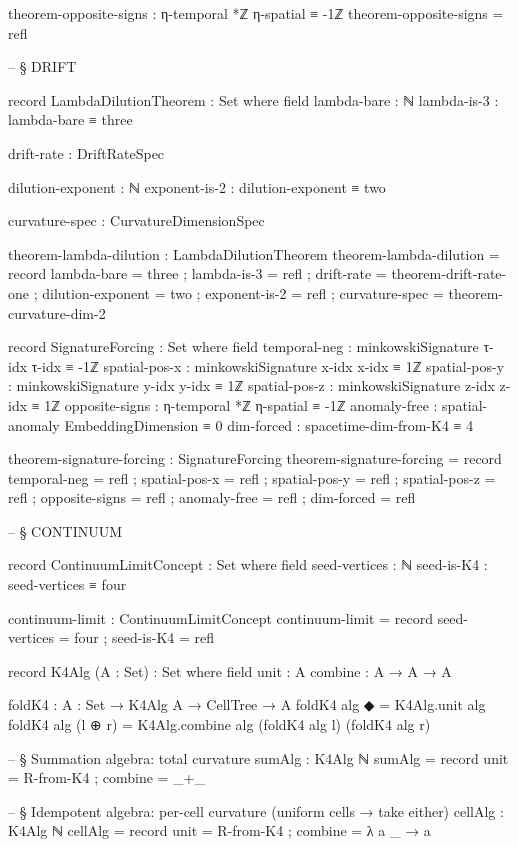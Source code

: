 \documentclass[11pt,a4paper]{book}
\begin{document}
\begin{code}
theorem-opposite-signs : η-temporal *ℤ η-spatial ≡ -1ℤ
theorem-opposite-signs = refl


-- § DRIFT

record LambdaDilutionTheorem : Set where
  field
    lambda-bare : ℕ
    lambda-is-3 : lambda-bare ≡ three
    
    drift-rate : DriftRateSpec
    
    dilution-exponent : ℕ
    exponent-is-2 : dilution-exponent ≡ two
    
    curvature-spec : CurvatureDimensionSpec
    
theorem-lambda-dilution : LambdaDilutionTheorem
theorem-lambda-dilution = record
  { lambda-bare = three
  ; lambda-is-3 = refl
  ; drift-rate = theorem-drift-rate-one
  ; dilution-exponent = two
  ; exponent-is-2 = refl
  ; curvature-spec = theorem-curvature-dim-2
  }

record SignatureForcing : Set where
  field
    temporal-neg   : minkowskiSignature τ-idx τ-idx ≡ -1ℤ
    spatial-pos-x  : minkowskiSignature x-idx x-idx ≡ 1ℤ
    spatial-pos-y  : minkowskiSignature y-idx y-idx ≡ 1ℤ
    spatial-pos-z  : minkowskiSignature z-idx z-idx ≡ 1ℤ
    opposite-signs : η-temporal *ℤ η-spatial ≡ -1ℤ
    anomaly-free   : spatial-anomaly EmbeddingDimension ≡ 0
    dim-forced     : spacetime-dim-from-K4 ≡ 4

theorem-signature-forcing : SignatureForcing
theorem-signature-forcing = record
  { temporal-neg   = refl
  ; spatial-pos-x  = refl
  ; spatial-pos-y  = refl
  ; spatial-pos-z  = refl
  ; opposite-signs = refl
  ; anomaly-free   = refl
  ; dim-forced     = refl
  }


-- § CONTINUUM

record ContinuumLimitConcept : Set where
  field
    seed-vertices : ℕ
    seed-is-K4 : seed-vertices ≡ four
    
continuum-limit : ContinuumLimitConcept
continuum-limit = record
  { seed-vertices = four
  ; seed-is-K4 = refl
  }

record K4Alg (A : Set) : Set where
  field
    unit    : A
    combine : A → A → A

foldK4 : {A : Set} → K4Alg A → CellTree → A
foldK4 alg ◆       = K4Alg.unit alg
foldK4 alg (l ⊕ r) = K4Alg.combine alg (foldK4 alg l) (foldK4 alg r)

-- § Summation algebra: total curvature
sumAlg : K4Alg ℕ
sumAlg = record { unit = R-from-K4 ; combine = _+_ }

-- § Idempotent algebra: per-cell curvature (uniform cells → take either)
cellAlg : K4Alg ℕ
cellAlg = record { unit = R-from-K4 ; combine = λ a _ → a }


\end{code}
\end{document}
